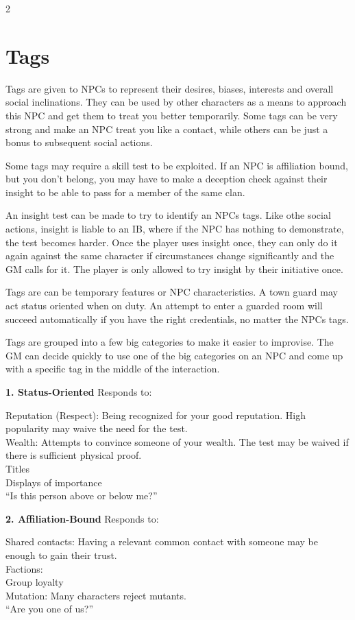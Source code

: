 \begin{multicols}{2}
\section{Tags}

Tags are given to NPCs to represent their desires, biases, interests and overall social inclinations. They can be used by other characters as a means to approach this NPC and get them to treat you better temporarily. Some tags can be very strong and make an NPC treat you like a contact, while others can be just a bonus to subsequent social actions.

Some tags may require a skill test to be exploited. If an NPC is affiliation bound, but you don't belong, you may have to make a deception check against their insight to be able to pass for a member of the same clan.

An insight test can be made to try to identify an NPCs tags. Like othe social actions, insight is liable to an IB, where if the NPC has nothing to demonstrate, the test becomes harder. Once the player uses insight once, they can only do it again against the same character if circumstances change significantly and the GM calls for it. The player is only allowed to try insight by their initiative once.

Tags are can be temporary features or NPC characteristics. A town guard may act status oriented when on duty. An attempt to enter a guarded room will succeed automatically if you have the right credentials, no matter the NPCs tags.

Tags are grouped into a few big categories to make it easier to improvise. The GM can decide quickly to use one of the big categories on an NPC and come up with a specific tag in the middle of the interaction.

\textbf{1. Status-Oriented}
Responds to:

Reputation (Respect): Being recognized for your good reputation. High popularity may waive the need for the test. \\
Wealth: Attempts  to convince someone of your wealth. The test may be waived if there is sufficient physical proof. \\
Titles \\
Displays of importance \\
“Is this person above or below me?”

\textbf{2. Affiliation-Bound}
Responds to:

Shared contacts: Having a relevant common contact with someone may be enough to gain their trust. \\
Factions: \\
Group loyalty \\
Mutation: Many characters reject mutants. \\
“Are you one of us?”


\end{multicols}
